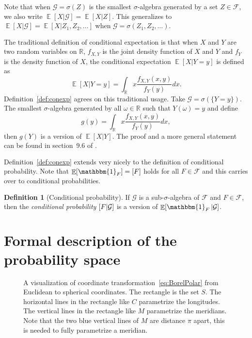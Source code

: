 \documentclass[twoside,a4paper]{report}
\theoremstyle{plain}
\theoremstyle{definition}
\newtheorem{definition}[theorem]{Definition}
\theoremstyle{remark}
\numberwithin{equation}{chapter}
\newcommand{\R}{\mathbb{R}}
\let\P\relax
\DeclareMathOperator{\P}{\mathbb{P}}
\DeclareMathOperator{\E}{\mathbb{E}}
\DeclareMathOperator{\1}{\mathbbm{1}}
\newcommand{\F}{\mathcal{F}}
\renewcommand{\G}{\mathcal{G}}
\begin{document}
Note that when $\G=\sigma(Z)$ is the smallest $\sigma$-algebra generated by a set $Z\in\F$, we also write $\E[X|\G]=\E[X|Z]$. This generalizes to $\E[X|\G]=\E[X|Z_1,Z_2,\ldots]$ when $\G=\sigma(Z_1,Z_2,\ldots)$.

The traditional definition of conditional expectation is that when $X$ and $Y$ are two random variables on $\R$, $f_{X,Y}$ is the joint density function of $X$ and $Y$ and $f_Y$ is the density function of $X$, the conditional expectation $\E[X|Y=y]$ is defined as
\begin{equation}
\E[X|Y=y]=\int_\R x\frac{f_{X,Y}(x,y)}{f_Y(y)}dx.
\end{equation}
Definition~\ref{def:conexp} agrees on this traditional usage. Take $\G=\sigma(\{Y=y\})$. The smallest $\sigma$-algebra generated by all $\omega\in\R$ such that $Y(\omega)=y$ and define
\begin{equation}
g(y)=\int_\R x\frac{f_{X,Y}(x,y)}{f_Y(y)}dx,
\end{equation}
then $g(Y)$ is a version of $\E[X|Y]$. The proof and a more general statement can be found in section~9.6 of \cite{Williams91}.

Definition~\ref{def:conexp} extends very nicely to the definition of conditional probability. Note that $\E[\1_F]=\P[F]$ holds for all $F\in\F$ and this carries over to conditional probabilities.

\begin{definition}[Conditional probability]
If $\G$ is a sub-$\sigma$-algebra of $\F$ and $F\in\F$, then the \emph{conditional probability} $\P[F|\G]$ is a version of $\E[\1_F|\G]$.
\end{definition}

\section{Formal description of the probability space}
\begin{figure}
\centering{

}
\caption{A visualization of coordinate transformation~\eqref{eq:BorelPolar} from Euclidean to spherical coordinates. The rectangle is the set $S$. The horizontal lines in the rectangle like $C$ parametrize the longitudes. The vertical lines in the rectangle like $M$ parametrize the meridians. Note that the two blue vertical lines of $M$ are distance $\pi$ apart, this is needed to fully parametrize a meridian.}
\label{fig:BorelVis}
\end{figure}
\end{document}
